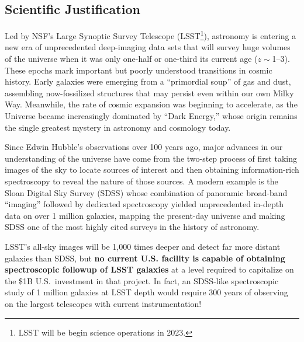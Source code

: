 \documentclass[oneside,11pt]{amsart}
\newcommand{\comment}[2][todo]{{\color{#1}[[{\bf #2}]]}}
\begin{document}
\subsection{Scientific Justification} 



Led by NSF's Large Synoptic Survey Telescope (LSST\footnote{LSST will be begin science operations in 2023.}), astronomy is entering a new era of unprecedented deep-imaging data
sets that will survey huge volumes of the universe when it was only one-half or one-third its current age ($z \sim
$1--3).  These epochs mark important but poorly understood transitions in cosmic history. Early galaxies were emerging
from a ``primordial soup'' of gas and dust, assembling now-fossilized structures that may persist even within our
own Milky Way.  Meanwhile, the rate of cosmic expansion was beginning to accelerate, as the Universe became
increasingly dominated by ``Dark Energy,'' whose origin remains the single greatest mystery in astronomy and cosmology
today.

Since Edwin Hubble's observations over 100 years ago, major advances in our understanding of the universe have come
from the two-step process of first taking images of the sky to locate sources of interest and then obtaining
information-rich spectroscopy to reveal the nature of those sources.  A modern example is the Sloan Digital Sky Survey
(SDSS) whose combination of panoramic broad-band ``imaging'' followed by dedicated spectroscopy yielded 
unprecedented in-depth data on over 1 million galaxies, mapping the present-day universe and making SDSS one of the most
highly cited surveys in the history of astronomy.


LSST's all-sky images will be 1,000 times deeper and detect far more distant galaxies than SDSS, but \textbf{no current
U.S. facility is capable of obtaining spectroscopic followup of LSST galaxies} at a level required to capitalize on the \$1B U.S.\
investment in that project.  In fact, an SDSS-like spectroscopic study of 1 million galaxies at LSST depth would require 300 years of observing on the largest telescopes with current instrumentation!  
\end{document}
